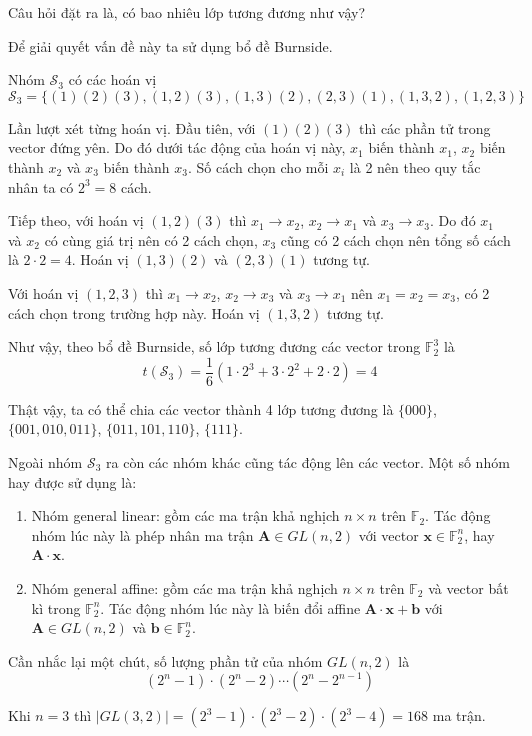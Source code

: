 \documentclass{mynotes}
\newcommand{\FF}{\mathbb{F}}
\begin{document}
Câu hỏi đặt ra là, có bao nhiêu lớp tương đương như vậy?

Để giải quyết vấn đề này ta sử dụng bổ đề Burnside.

Nhóm $\mathcal{S}_3$ có các hoán vị \[ \mathcal{S}_3 = \{ (1)(2)(3), (1, 2)(3), (1, 3)(2), (2, 3)(1), (1, 3, 2), (1, 2, 3) \} \]

Lần lượt xét từng hoán vị. Đầu tiên, với $(1)(2)(3)$ thì các phần tử trong vector đứng yên. Do đó dưới tác động của hoán vị này, $x_1$ biến thành $x_1$, $x_2$ biến thành $x_2$ và $x_3$ biến thành $x_3$. Số cách chọn cho mỗi $x_i$ là 2 nên theo quy tắc nhân ta có $2^3 = 8$ cách.

Tiếp theo, với hoán vị $(1, 2)(3)$ thì $x_1 \to x_2$, $x_2 \to x_1$ và $x_3 \to x_3$. Do đó $x_1$ và $x_2$ có cùng giá trị nên có 2 cách chọn, $x_3$ cũng có 2 cách chọn nên tổng số cách là $2 \cdot 2 = 4$. Hoán vị $(1, 3)(2)$ và $(2, 3)(1)$ tương tự.

Với hoán vị $(1, 2, 3)$ thì $x_1 \to x_2$, $x_2 \to x_3$ và $x_3 \to x_1$ nên $x_1 = x_2 = x_3$, có 2 cách chọn trong trường hợp này. Hoán vị $(1, 3, 2)$ tương tự.

Như vậy, theo bổ đề Burnside, số lớp tương đương các vector trong $\FF_2^3$ là \[ t(\mathcal{S}_3) = \frac{1}{6} (1 \cdot 2^3 + 3 \cdot 2^2 + 2 \cdot 2) = 4 \]

Thật vậy, ta có thể chia các vector thành 4 lớp tương đương là $\{ 000 \}$, $\{ 001, 010, 011 \}$, $\{ 011, 101, 110 \}$, $\{ 111 \}$.

Ngoài nhóm $\mathcal{S}_3$ ra còn các nhóm khác cũng tác động lên các vector. Một số nhóm hay được sử dụng là:

\begin{enumerate}
    \item Nhóm general linear: gồm các ma trận khả nghịch $n \times n$ trên $\FF_2$. Tác động nhóm lúc này là phép nhân ma trận $\bm{A} \in GL(n, 2)$ với vector $\bm{x} \in \FF_2^n$, hay $\bm{A} \cdot \bm{x}$.
    \item Nhóm general affine: gồm các ma trận khả nghịch $n \times n$ trên $\FF_2$ và vector bất kì trong $\FF_2^n$. Tác động nhóm lúc này là biến đổi affine $\bm{A} \cdot \bm{x} + \bm{b}$ với $\bm{A} \in GL(n, 2)$ và $\bm{b} \in \FF_2^n$.
\end{enumerate}

Cần nhắc lại một chút, số lượng phần tử của nhóm $GL(n, 2)$ là \[ (2^n - 1) \cdot (2^n - 2) \cdots (2^n - 2^{n-1}) \]

Khi $n = 3$ thì $\lvert GL(3, 2) \rvert = (2^3 - 1) \cdot (2^3 - 2) \cdot (2^3 - 4) = 168$ ma trận.
\end{document}
